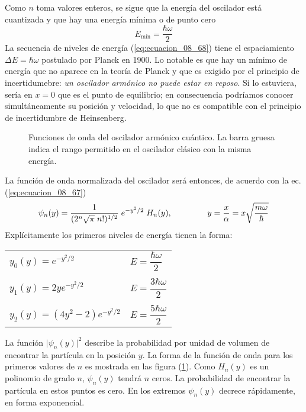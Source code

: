 Como $n$ toma valores enteros, se sigue que la energía del oscilador está cuantizada y que hay una energía mínima o de punto cero
\[ E_{\text{mín}} = \dfrac{\hbar \omega}{2} \]
La secuencia de niveles de energía (\ref{eq:ecuacion_08_68}) tiene el espaciamiento $\Delta E = \hbar \omega$ postulado por Planck en 1900. Lo notable es que hay un mínimo de energía que no aparece en la teoría de Planck y que es exigido por el principio de incertidumebre: \emph{un oscilador armónico no puede estar en reposo}. Si lo estuviera, sería en $x=0$ que es el punto de equilibrio; en consecuencia podríamos conocer simultáneamente su posición y velocidad, lo que no es compatible con el principio de incertidumbre de Heinsenberg.
\begin{figure}[H]
\centering

\label{fig:figura_08_11}
\caption{Funciones de onda del oscilador armónico cuántico. La barra gruesa indica el rango permitido en el oscilador clásico con la misma energía.}
\end{figure}
La función de onda normalizada del oscilador será entonces, de acuerdo con la ec. (\ref{eq:ecuacion_08_67})
\begin{equation}
\psi_{n}(y) = \dfrac{1}{(2^{n} \sqrt{\pi} \; n!)^{1/2}} \; e^{-y^{2}/2} \; H_{n}(y), \hspace{1.5cm} y = \dfrac{x}{\alpha} = x \sqrt{\dfrac{m \omega}{\hbar}}
\label{eq:ecuacion_08_69}
\end{equation}
Explícitamente los primeros niveles de energía tienen la forma:
\begin{center}
\begin{tabular}{l l}
$y_{0}(y) = e^{-y^{2}/2}$ & $E = \dfrac{\hbar \omega}{2}$ \\
[0em] \\
$y_{1}(y) = 2 y e^{-y^{2}/2}$ & $E = \dfrac{3 \hbar \omega}{2}$ \\
[0em] \\
$y_{2}(y) = (4 y^{2} - 2) e^{-y^{2}/2}$ & $E = \dfrac{5 \hbar \omega}{2}$ 
\end{tabular}
\end{center}
La función $\vert \psi_{n}(y) \vert^{2}$ describe la probabilidad por unidad de volumen de encontrar la partícula en la posición $y$. La forma de la función de onda para los primeros valores de $n$ es mostrada en las figura (\ref{fig:figura_08_11}). Como $H_{n}(y)$ es un polinomio de grado $n$, $\psi_{n}(y)$ tendrá $n$ ceros. La probabilidad de encontrar la partícula en estos puntos es cero. En los extremos  $\psi_{n}(y)$ decrece rápidamente, en forma exponencial.

